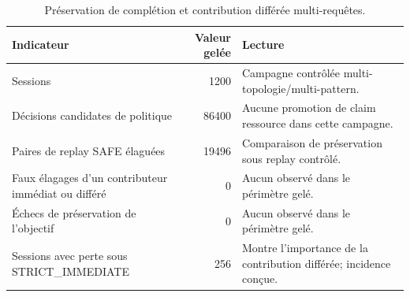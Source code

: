 \begin{table}[t]
\centering
\caption{Préservation de complétion et contribution différée multi-requêtes.}
\label{tab:nh-r2-preservation}
\small
\begin{tabular}{p{}r p{}}
\hline
Indicateur & Valeur gelée & Lecture \\
\hline
Sessions & 1200 & Campagne contrôlée multi-topologie/multi-pattern. \\
Décisions candidates de politique & 86400 & Aucune promotion de claim ressource dans cette campagne. \\
Paires de replay SAFE élaguées & 19496 & Comparaison de préservation sous replay contrôlé. \\
Faux élagages d'un contributeur immédiat ou différé & 0 & Aucun observé dans le périmètre gelé. \\
Échecs de préservation de l'objectif & 0 & Aucun observé dans le périmètre gelé. \\
Sessions avec perte sous STRICT\_IMMEDIATE & 256 & Montre l'importance de la contribution différée; incidence conçue. \\
\hline
\end{tabular}
\end{table}
